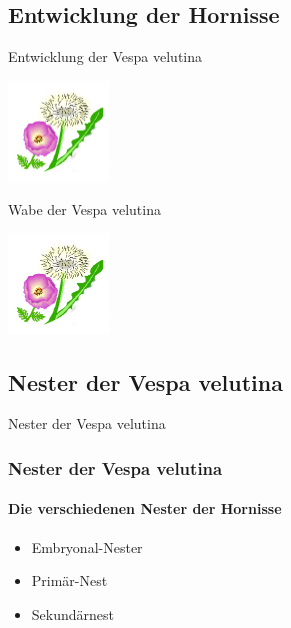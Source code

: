 \documentclass[aspectratio=169]{beamer}
\begin{document}

\subsection[Entwicklung]{Entwicklung der Hornisse}

\begin{frame}{Entwicklung der Vespa velutina}

	\begin{center}	
		\includegraphics[width=0.2\textwidth]{figures/BH-Logo_Quat.png}
	\end{center}

	\end{frame}

	\begin{frame}{Wabe der Vespa velutina}
		\begin{center}	
			\includegraphics[width=0.2\textwidth]{figures/BH-Logo_Quat.png}
		\end{center}

		\end{frame}


\subsection[Nester]{Nester der Vespa velutina}

\begin{frame}{Nester der Vespa velutina}
    \frametitle{Nester der Vespa velutina} 
    \framesubtitle{Die verschiedenen Nester der Hornisse}
    \begin{itemize} 
        \item 
            Embryonal-Nester \pause
        \item 
            Primär-Nest \pause
        \item 
            Sekundärnest 
    \end{itemize}
 
    \end{frame}
\end{document}
